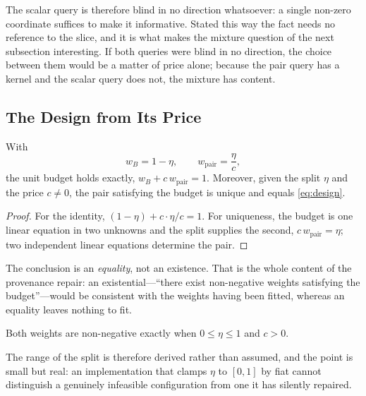The scalar query is therefore blind in no direction whatsoever: a single non-zero coordinate
suffices to make it informative. Stated this way the fact needs no reference to the slice, and
it is what makes the mixture question of the next subsection interesting. If both queries were
blind in no direction, the choice between them would be a matter of price alone; because the
pair query has a kernel and the scalar query does not, the mixture has content.

\subsection{The Design from Its Price}
\label{sec:design}

\begin{theorem}
\label{thm:unique}
With
\begin{equation}
w_{B}=1-\eta,\qquad
w_{\mathrm{pair}}=\frac{\eta}{c},
\label{eq:design}
\end{equation}
the unit budget holds exactly, $w_{B}+c\,w_{\mathrm{pair}}=1$. Moreover, given the split
$\eta$ and the price $c\neq0$, the pair satisfying the budget is unique and equals
\eqref{eq:design}.
\end{theorem}

\begin{proof}
For the identity, $(1-\eta)+c\cdot\eta/c=1$. For uniqueness, the budget is one linear
equation in two unknowns and the split supplies the second, $c\,w_{\mathrm{pair}}=\eta$; two
independent linear equations determine the pair.
\end{proof}


The conclusion is an \emph{equality}, not an existence. That is the whole content of the
provenance repair: an existential---``there exist non-negative weights satisfying the
budget''---would be consistent with the weights having been fitted, whereas an equality leaves
nothing to fit.

\begin{proposition}
\label{prop:nonneg}
Both weights are non-negative exactly when $0\le\eta\le1$ and $c>0$.
\end{proposition}


The range of the split is therefore derived rather than assumed, and the point is small but
real: an implementation that clamps $\eta$ to $[0,1]$ by fiat cannot distinguish a genuinely
infeasible configuration from one it has silently repaired.


